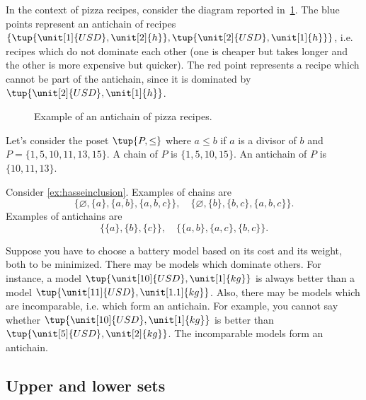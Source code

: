 In the context of pizza recipes, consider the diagram reported in~\cref{fig:antichain}. The blue points represent an antichain of recipes $\{\tup{\unit[1]{USD},\unit[2]{h}},\tup{\unit[2]{USD},\unit[1]{h}}\}$, i.e. recipes which do not dominate each other (one is cheaper but takes longer and the other is more expensive but quicker). The red point represents a recipe which cannot be part of the antichain, since it is dominated by $\tup{\unit[2]{USD},\unit[1]{h}}$. 

\begin{figure}[h!]
\begin{center}
\end{center}
\caption{Example of an antichain of pizza recipes. \label{fig:antichain}}
\end{figure}


\begin{example}
Let's consider the poset $\tup{P,\leq}$ where $a\leq b$ if $a$ is a divisor of $b$ and $P=\{1,5,10,11,13,15\}$. A chain of $P$ is $\{1,5,10,15\}$. An antichain of $P$ is $\{10,11,13\}$.
\end{example}

\begin{example}
Consider \cref{ex:hasseinclusion}. Examples of chains are 
\begin{equation}
    \{\varnothing,\{a\},\{a,b\},\{a,b,c\}\}, \quad  \{\varnothing,\{b\},\{b,c\},\{a,b,c\}\}.
\end{equation}
Examples of antichains are
\begin{equation}
    \{\{a\},\{b\},\{c\}\}, \quad \{ \{a,b\},\{a,c\}, \{b,c\}\}.
\end{equation}
\end{example}

\begin{example}
\label{ex:battery}
Suppose you have to choose a battery model based on its cost and its weight, both to be minimized. There may be models which dominate others. For instance, a model $\tup{\unit[10]{USD},\unit[1]{kg}}$ is always better than a model $\tup{\unit[11]{USD},\unit[1.1]{kg}}$. Also, there may be models which are incomparable, i.e. which form an antichain. For example, you cannot say whether $\tup{\unit[10]{USD},\unit[1]{kg}}$ is better than  $\tup{\unit[5]{USD},\unit[2]{kg}}$. The incomparable models form an antichain.
\end{example}

\subsection{Upper and lower sets}

